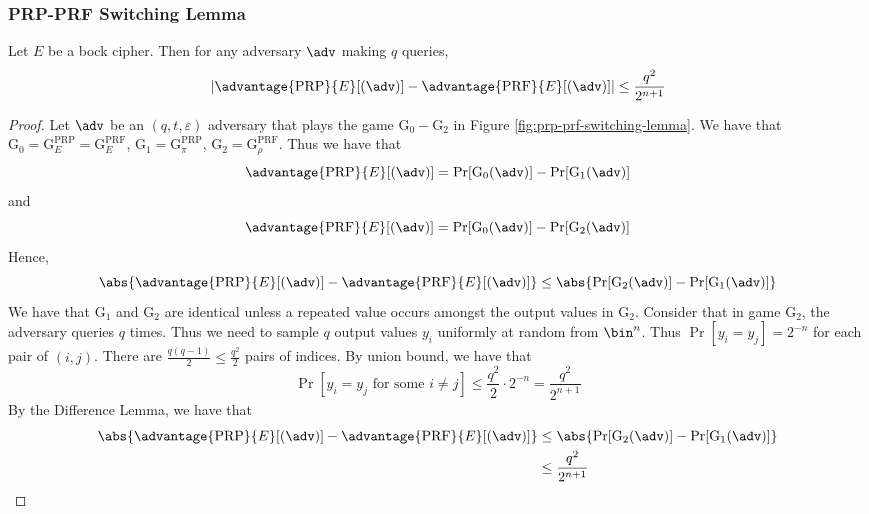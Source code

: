 \documentclass[11pt,a4paper]{article}
\newcommand{\PRP}{\text{PRP}}
\newcommand{\PRF}{\text{PRF}}
\begin{document}
\subsubsection{PRP-PRF Switching Lemma} Let $E$ be a bock cipher. Then for any adversary $\adv$ making $q$ queries,
$$
|\advantage{\PRP}{E}[(\adv)] - \advantage{\PRF}{E}[(\adv)]| \leq \frac{q^2}{2^{n+1}}
$$

\begin{proof}
Let $\adv$ be an $(q,t,\varepsilon)$ adversary that plays the game $\mathrm{G}_0 - \mathrm{G}_2$ in Figure \ref{fig:prp-prf-switching-lemma}. 
We have that $\mathrm{G}_0 = \mathrm{G}^{\PRP}_E = \mathrm{G}^{\PRF}_E $,  $\mathrm{G}_1 = \mathrm{G}^{\PRP}_\pi$, $\mathrm{G}_2 = \mathrm{G}^{\PRF}_\rho$. 
Thus we have that 
$$
\advantage{\PRP}{E}[(\adv)] = \Pr[\mathrm{G}_0(\adv)] - \Pr[\mathrm{G}_1(\adv)]
$$
and 
$$
\advantage{\PRF}{E}[(\adv)] = \Pr[\mathrm{G}_0(\adv)] - \Pr[\mathrm{G}_2(\adv)]
$$
Hence, 
$$
\abs{\advantage{\PRP}{E}[(\adv)] -  \advantage{\PRF}{E}[(\adv)]}  \leq \abs{\Pr[\mathrm{G}_2(\adv)] - \Pr[\mathrm{G}_1(\adv)]}
$$
We have that $\mathrm{G}_1$ and $\mathrm{G}_2$ are identical unless a repeated value occurs amongst the output values in $\mathrm{G}_2$. Consider that in game $\mathrm{G}_2$, the adversary queries $q$ times. Thus we need to sample $q$ output values $y_i$ uniformly at random from $\bin^n$. Thus $\Pr[y_i = y_j] = 2^{-n}$ for each pair of $(i,j)$. There are $\frac{q(q-1)}{2} \leq \frac{q^2}{2}$ pairs of indices. By union bound, we have that 
$$
\Pr[y_i = y_j \text{ for some } i \neq j ] \leq \frac{q^2}{2}
 \cdot 2^{-n} = \frac{q^2}{2^{n+1}}
 $$
 By the Difference Lemma, we have that 
 $$
 \begin{aligned}
 \abs{\advantage{\PRP}{E}[(\adv)] -  \advantage{\PRF}{E}[(\adv)]} &\leq \abs{\Pr[\mathrm{G}_2(\adv)] - \Pr[\mathrm{G}_1(\adv)]} \\
 &\leq \frac{q^2}{2^{n+1}}
 \end{aligned}
 $$

\end{proof}
\end{document}
